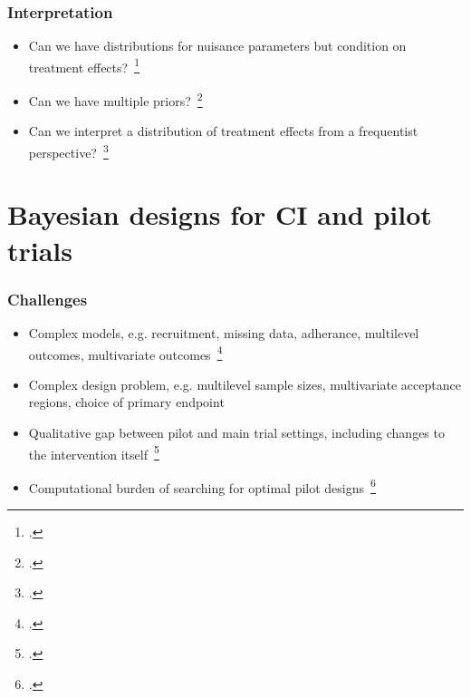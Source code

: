 \documentclass{beamer}
\begin{document}

\begin{frame}
\frametitle{Interpretation}
\begin{itemize}
\item Can we have distributions for nuisance parameters but condition on treatment effects?~\footcite{Turner2004}
\item Can we have multiple priors?~\footcite{Chen2011a, Kirby2012}
\item Can we interpret a distribution of treatment effects from a frequentist perspective?~\footcite{Goette2015, Julious2006}
\end{itemize}
\end{frame}

\section{Bayesian designs for CI and pilot trials}

\frame{\tableofcontents[currentsection]}

\begin{frame}
\frametitle{Challenges}
\begin{itemize}
\item Complex models, e.g. recruitment, missing data, adherance, multilevel outcomes, multivariate outcomes~\footcite{Landau2013}
\item Complex design problem, e.g. multilevel sample sizes, multivariate acceptance regions, choice of primary endpoint
\item Qualitative gap between pilot and main trial settings, including changes to the intervention itself~\footcite{Hampson2017}
\item Computational burden of searching for optimal pilot designs~\footcite{Strong2015}
\end{itemize}
\end{frame}
\end{document}
